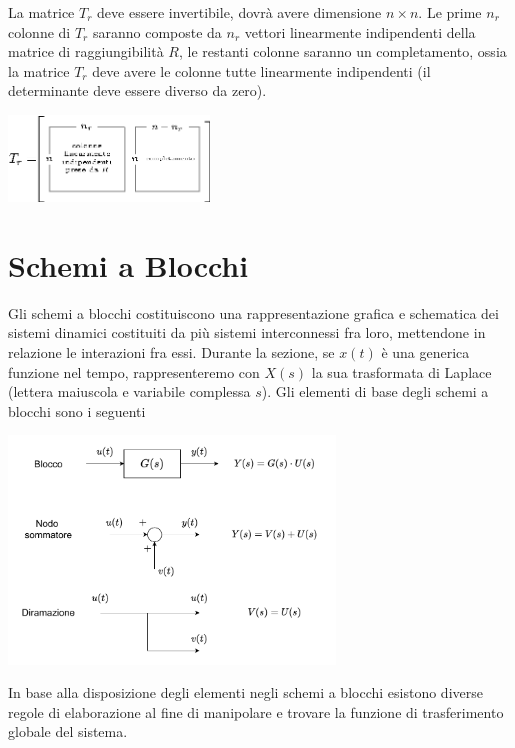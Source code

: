 \documentclass[10pt, letterpaper]{report}
\begin{document}
La matrice $T_r$ deve essere invertibile, dovrà avere dimensione $n\times n$. Le prime $n_r$ colonne 
di $T_r$ saranno composte da $n_r$ vettori linearmente indipendenti della matrice di raggiungibilità 
$R$, le restanti colonne saranno un completamento, ossia la matrice $T_r$  deve avere le colonne 
tutte linearmente indipendenti (il determinante deve essere diverso da zero).
\begin{center}
    \includegraphics[width=0.4\textwidth ]{images/matriceT.eps}
\end{center}
\flowerLine\newpage 







\section{Schemi a Blocchi}
Gli schemi a blocchi costituiscono una rappresentazione grafica e schematica dei sistemi dinamici 
costituiti da più sistemi interconnessi fra loro, mettendone in relazione le 
interazioni fra essi. Durante la sezione, se $x(t)$ è una generica funzione nel tempo, rappresenteremo
con $X(s)$ la sua trasformata di Laplace (lettera maiuscola e variabile complessa $s$). Gli elementi di base 
degli schemi a blocchi sono i seguenti
\begin{center}
    \includegraphics[width=0.65\textwidth ]{images/schemiBlocchiElementi.pdf}
\end{center}
In base alla disposizione degli elementi negli schemi a blocchi esistono diverse regole di elaborazione 
al fine di manipolare e trovare la funzione di trasferimento globale del sistema.
\end{document}
